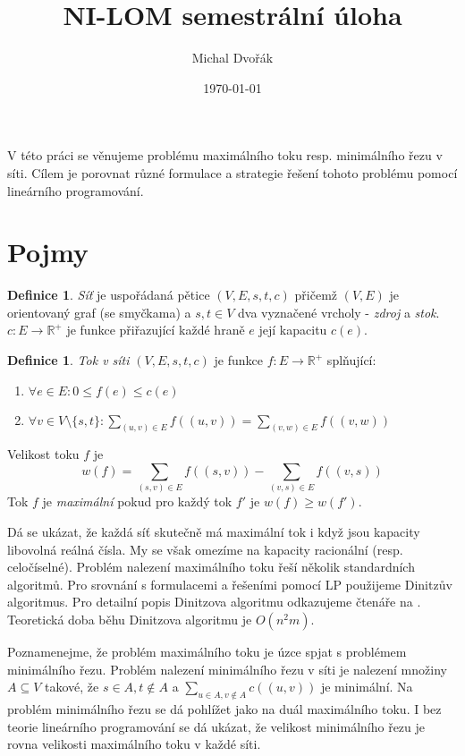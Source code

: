 \documentclass{article}
\title{NI-LOM semestrální úloha}
\author{Michal Dvořák}
\date{\today}
\theoremstyle{plain}
\theoremstyle{definition}
\newtheorem{defn}[thm]{Definice}
\begin{document}
\maketitle

V této práci se věnujeme problému maximálního toku resp. minimálního řezu v síti. Cílem je porovnat různé formulace a strategie řešení tohoto problému pomocí lineárního programování.

\section{Pojmy}

\begin{defn}
	\textit{Síť} je uspořádaná pětice $(V,E,s,t,c)$ přičemž $(V,E)$ je orientovaný graf (se smyčkama) a $s,t\in V$ dva vyznačené vrcholy - \textit{zdroj} a \textit{stok}. $c\colon E\rightarrow \mathbb{R}^+$ je funkce přiřazující každé hraně $e$ její kapacitu $c(e)$.
\end{defn}
\begin{defn}
	\textit{Tok v síti} $(V,E,s,t,c)$ je funkce $f\colon E\rightarrow \mathbb{R}^+$ splňující:
	\begin{enumerate}
		\item $\forall e \in E\colon 0\leq f(e)\leq c(e)$
		\item $\forall v\in V\setminus\{s,t\}\colon \sum_{(u,v)\in E} f((u,v))=\sum_{(v,w)\in E}f((v,w))$
	\end{enumerate}
	Velikost toku $f$ je
	$$
	w(f) = \sum_{(s,v)\in E}f((s,v))-\sum_{(v,s)\in E}f((v,s))
	$$
	Tok $f$ je \textit{maximální} pokud pro každý tok $f'$ je $w(f)\geq w(f')$.
\end{defn}

Dá se ukázat, že každá síť skutečně má maximální tok i když jsou kapacity libovolná reálná čísla. My se však omezíme na kapacity racionální (resp. celočíselné). Problém nalezení maximálního toku řeší několik standardních algoritmů. Pro srovnání s formulacemi a řešeními pomocí LP použijeme Dinitzův algoritmus. Pro detailní popis Dinitzova algoritmu odkazujeme čtenáře na \cite{labyrint}. Teoretická doba běhu Dinitzova algoritmu je $O(n^2m)$.


Poznamenejme, že problém maximálního toku je úzce spjat s problémem minimálního řezu. Problém nalezení minimálního řezu v síti je nalezení množiny $A\subseteq V$ takové, že $s\in A,t\notin A$ a $\sum_{u\in A,v\notin A}c((u,v))$ je minimální. Na problém minimálního řezu se dá pohlížet jako na duál maximálního toku. I bez teorie lineárního programování se dá ukázat, že velikost minimálního řezu je rovna velikosti maximálního toku v každé síti.
\end{document}
